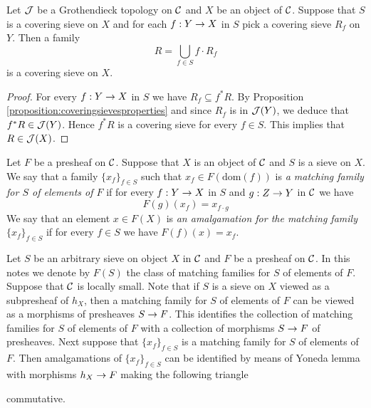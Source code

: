 \begin{fact}\label{fact:compositionofcoveringsieves}
Let ${\mathcal J}$ be a Grothendieck topology on ${\mathcal C}$ and $X$ be an object of ${\mathcal C}$. Suppose that $S$ is a covering sieve on $X$ and for each $f:Y\rightarrow X$ in $S$ pick a covering sieve $R_f$ on $Y$. Then a family
$$R=\bigcup_{f\in S}f\cdot R_f$$ 
is a covering sieve on $X$.
\end{fact}
\begin{proof}
For every $f:Y\rightarrow X$ in $S$ we have $R_f\subseteq f^*R$. By Proposition \ref{proposition:coveringsievesproperties} and since $R_f$ is in ${\mathcal J}(Y)$, we deduce that $f^*R\in {\mathcal J}(Y)$. Hence $f^*R$ is a covering sieve for every $f\in S$. This implies that $R\in {\mathcal J}(X)$.
\end{proof}

\begin{definition}
Let $F$ be a presheaf on ${\mathcal C}$. Suppose that $X$ is an object of ${\mathcal C}$ and $S$ is a sieve on $X$. We say that a family $\{x_f\}_{f\in S}$ such that $x_f\in F(\mathrm{dom}(f))$ is \textit{a matching family for $S$ of elements of $F$} if for every $f:Y\rightarrow X$ in $S$ and $g:Z\rightarrow Y$ in ${\mathcal C}$ we have
$$F(g)(x_f)=x_{f\cdot g}$$
We say that an element $x\in F(X)$ is \textit{an amalgamation for the matching family} $\{x_f\}_{f\in S}$ if for every $f\in S$ we have $F(f)(x)=x_f$.
\end{definition}
\noindent
Let $S$ be an arbitrary sieve on object $X$ in ${\mathcal C}$ and $F$ be a presheaf on ${\mathcal C}$. In this notes we denote by $F(S)$ the class of matching families for $S$ of elements of $F$.\\
Suppose that ${\mathcal C}$ is locally small. Note that if $S$ is a sieve on $X$ viewed as a subpresheaf of $h_X$, then a matching family for $S$ of elements of $F$ can be viewed as a morphisms of presheaves $S\rightarrow F$. This identifies the collection of matching families for $S$ of elements of $F$ with a collection of morphisms $S\rightarrow F$ of presheaves. Next suppose that $\{x_f\}_{f\in S}$ is a matching family for $S$ of elements of $F$. Then amalgamations of $\{x_f\}_{f\in S}$ can be identified by means of Yoneda lemma {\cite[Theorem 3.3]{Presheaves}} with morphisms $h_X\rightarrow F$ making the following triangle
\begin{center}
\end{center}
commutative.

